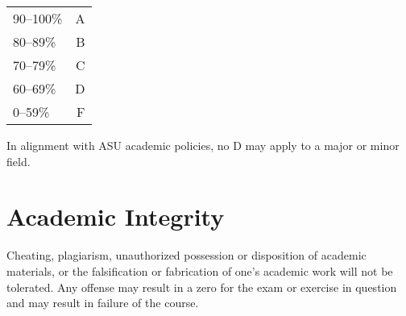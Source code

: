 \documentclass[letterpaper, landscape]{article}
\begin{document}
  \begin{tabular}{lr}
    \toprule
    90--100\% & A \\
    80--89\%  & B \\
    70--79\%  & C \\
    60--69\%  & D \\
    0--59\%   & F \\
    \bottomrule
  \end{tabular}

  In alignment with ASU academic policies, no D may apply to a major or minor field.



  \section{Academic Integrity}

  Cheating, plagiarism, unauthorized possession or disposition of academic
  materials, or the falsification or fabrication of one’s academic work will
  not be tolerated. Any offense may result in a zero for the exam or exercise
  in question and may result in failure of the course. 
  

  

  
\end{document}
